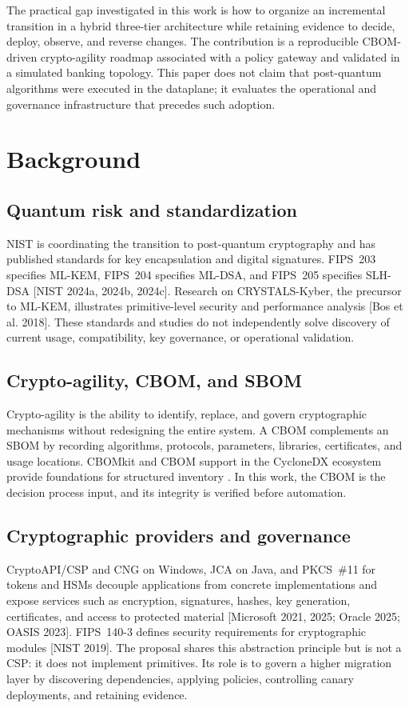 \documentclass[12pt]{article}
\newcommand{\sbcshortcite}[2]{[#1]\nocite{#2}}
\begin{document}
The practical gap investigated in this work is how to organize an incremental transition in a hybrid three-tier architecture while retaining evidence to decide, deploy, observe, and reverse changes. The contribution is a reproducible CBOM-driven crypto-agility roadmap associated with a policy gateway and validated in a simulated banking topology. This paper does not claim that post-quantum algorithms were executed in the dataplane; it evaluates the operational and governance infrastructure that precedes such adoption.

\section{Background}
\subsection{Quantum risk and standardization}
NIST is coordinating the transition to post-quantum cryptography and has published standards for key encapsulation and digital signatures. FIPS~203 specifies ML-KEM, FIPS~204 specifies ML-DSA, and FIPS~205 specifies SLH-DSA \sbcshortcite{NIST 2024a, 2024b, 2024c}{fips203,fips204,fips205}. Research on CRYSTALS-Kyber, the precursor to ML-KEM, illustrates primitive-level security and performance analysis \sbcshortcite{Bos et al. 2018}{bos2018}. These standards and studies do not independently solve discovery of current usage, compatibility, key governance, or operational validation.

\subsection{Crypto-agility, CBOM, and SBOM}
Crypto-agility is the ability to identify, replace, and govern cryptographic mechanisms without redesigning the entire system. A CBOM complements an SBOM by recording algorithms, protocols, parameters, libraries, certificates, and usage locations. CBOMkit and CBOM support in the CycloneDX ecosystem provide foundations for structured inventory \cite{ibm-cbom,cbomkit,cyclonedx-cbom}. In this work, the CBOM is the decision process input, and its integrity is verified before automation.

\subsection{Cryptographic providers and governance}
CryptoAPI/CSP and CNG on Windows, JCA on Java, and PKCS~\#11 for tokens and HSMs decouple applications from concrete implementations and expose services such as encryption, signatures, hashes, key generation, certificates, and access to protected material \sbcshortcite{Microsoft 2021, 2025; Oracle 2025; OASIS 2023}{microsoft-csp,microsoft-cng,oracle-jca,oasis-pkcs11}. FIPS~140-3 defines security requirements for cryptographic modules \sbcshortcite{NIST 2019}{fips1403}. The proposal shares this abstraction principle but is not a CSP: it does not implement primitives. Its role is to govern a higher migration layer by discovering dependencies, applying policies, controlling canary deployments, and retaining evidence.
\end{document}
